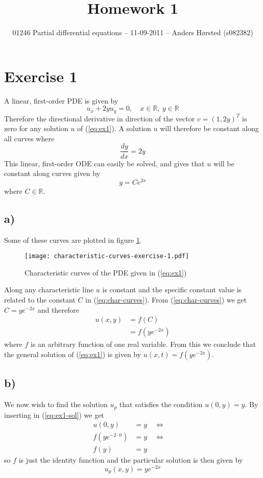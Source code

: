 \documentclass[11pt]{article}
\title{Homework 1}
\author{01246 Partial differential equations -- 11-09-2011 -- Anders Hørsted (s082382)}
\date{} %
\newcommand\myimp{\quad\Leftrightarrow\quad}
\newcommand\myreal{\mathbb{R}}
\begin{document}
\section*{Exercise 1}

A linear, first-order PDE is given by
\begin{equation}\label{eq:ex1}
    u_x + 2yu_y = 0, \quad x\in\myreal,\:y\in\myreal
\end{equation}
Therefore the directional derivative in direction of the vector $v=(1, 2y)^T$ is zero for any solution $u$ of (\ref{eq:ex1}). A solution $u$ will therefore be constant along all curves where
\begin{equation*}
    \frac{dy}{dx} = 2y
\end{equation*}
This linear, first-order ODE can easily be solved, and gives that $u$ will be constant along curves given by
\begin{equation}\label{eq:char-curves}
    y = Ce^{2x}
\end{equation}
where $C\in\myreal$. 

\subsection*{a)}
Some of these curves are plotted in figure \ref{fig:char-curves}.
\begin{figure}
    \centering
    \texttt{[image: characteristic-curves-exercise-1.pdf]}
    \caption{Characteristic curves of the PDE given in (\ref{eq:ex1})}\label{fig:char-curves}
\end{figure}
Along any characteristic line $u$ is constant and the specific constant value is related to the constant $C$ in (\ref{eq:char-curves}). From (\ref{eq:char-curves}) we get $C=ye^{-2x}$ and therefore
\begin{align}
    u(x, y) &= f(C) \nonumber\\
            &= f(ye^{-2x})\label{eq:ex1-sol}
\end{align}
where $f$ is an arbitrary function of one real variable. From this we conclude that the general solution of (\ref{eq:ex1}) is given by $u(x, t)=f(ye^{-2x})$.

\subsection*{b)}
We now wish to find the solution $u_p$ that satisfies the condition $u(0,y)=y$. By inserting in (\ref{eq:ex1-sol}) we get
\begin{align*}
    u(0, y) &= y \myimp \\
    f(ye^{-2\cdot 0}) &= y \myimp \\
    f(y) &= y
\end{align*}
so $f$ is just the identity function and the particular solution is then given by
\begin{equation*}
    u_p(x, y) = ye^{-2x}
\end{equation*}
\end{document}
